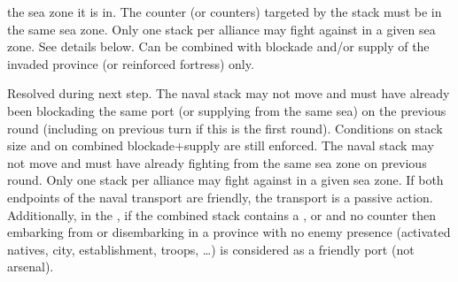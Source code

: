 the sea zone it is in. The \corsaire counter (or counters) targeted by the
stack must be in the same sea zone. Only one stack per alliance may fight
against \corsaire in a given sea zone.
 See details below. Can be combined with blockade
and/or supply of the invaded province (or reinforced fortress) only.


\bparag[Exploration.] Resolved during next step.
 The naval stack may not move and
must have already been blockading the same port (or supplying from the same
sea) on the previous round (including on previous turn if this is the first
round). Conditions on stack size and on combined blockade+supply are still
enforced.
 The naval stack may not move and
must have already fighting \corsaire from the same sea zone on previous
round. Only one stack per alliance may fight against \corsaire in a given sea
zone.
 If both endpoints of the naval transport
are friendly, the transport is a passive action. Additionally, in the \ROTW,
if the combined stack contains a \LeaderE, \LeaderC or \LeaderGov and no \ARMY
counter then embarking from or disembarking in a province with no enemy
presence (activated natives, city, establishment, troops, \ldots) is
considered as a friendly port (not arsenal).


